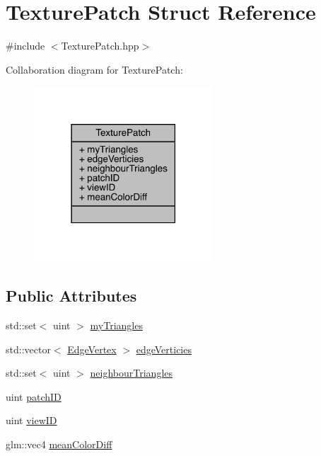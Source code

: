 \hypertarget{struct_texture_patch}{}\section{Texture\+Patch Struct Reference}
\label{struct_texture_patch}


{\ttfamily \#include $<$Texture\+Patch.\+hpp$>$}



Collaboration diagram for Texture\+Patch\+:\nopagebreak
\begin{figure}[H]
\begin{center}
\leavevmode
\includegraphics[width=190pt]{struct_texture_patch__coll__graph}
\end{center}
\end{figure}
\subsection*{Public Attributes}
\begin{DoxyCompactItemize}
\item 
std\+::set$<$ uint $>$ \hyperlink{struct_texture_patch_a6508eab52b765ffa3f5b185956334f47}{my\+Triangles}
\item 
std\+::vector$<$ \hyperlink{struct_edge_vertex}{Edge\+Vertex} $>$ \hyperlink{struct_texture_patch_a93366f5b9cc0d02ba08ffb4fba64d977}{edge\+Verticies}
\item 
std\+::set$<$ uint $>$ \hyperlink{struct_texture_patch_a002b3455ab2599b42b78c34c1d887f94}{neighbour\+Triangles}
\item 
uint \hyperlink{struct_texture_patch_a359bb72c7d9793ff22e9d6272b016521}{patch\+I\+D}
\item 
uint \hyperlink{struct_texture_patch_a97acb0ad9531af6cc0c366640d3575e1}{view\+I\+D}
\item 
glm\+::vec4 \hyperlink{struct_texture_patch_a1285c94f40ae56464f33eaf69fb93617}{mean\+Color\+Diff}
\end{DoxyCompactItemize}


